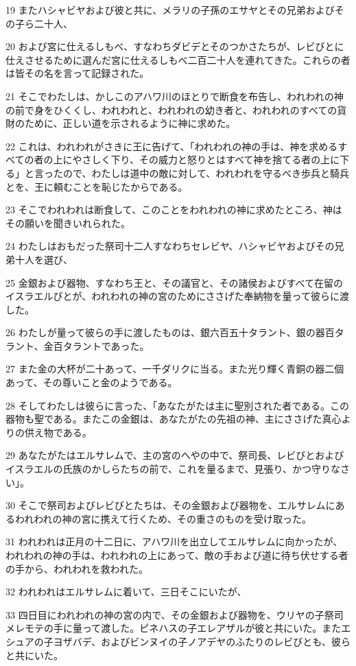 \par 19 またハシャビヤおよび彼と共に、メラリの子孫のエサヤとその兄弟およびその子ら二十人、
\par 20 および宮に仕えるしもべ、すなわちダビデとそのつかさたちが、レビびとに仕えさせるために選んだ宮に仕えるしもべ二百二十人を連れてきた。これらの者は皆その名を言って記録された。
\par 21 そこでわたしは、かしこのアハワ川のほとりで断食を布告し、われわれの神の前で身をひくくし、われわれと、われわれの幼き者と、われわれのすべての貨財のために、正しい道を示されるように神に求めた。
\par 22 これは、われわれがさきに王に告げて、「われわれの神の手は、神を求めるすべての者の上にやさしく下り、その威力と怒りとはすべて神を捨てる者の上に下る」と言ったので、わたしは道中の敵に対して、われわれを守るべき歩兵と騎兵とを、王に頼むことを恥じたからである。
\par 23 そこでわれわれは断食して、このことをわれわれの神に求めたところ、神はその願いを聞きいれられた。
\par 24 わたしはおもだった祭司十二人すなわちセレビヤ、ハシャビヤおよびその兄弟十人を選び、
\par 25 金銀および器物、すなわち王と、その議官と、その諸侯およびすべて在留のイスラエルびとが、われわれの神の宮のためにささげた奉納物を量って彼らに渡した。
\par 26 わたしが量って彼らの手に渡したものは、銀六百五十タラント、銀の器百タラント、金百タラントであった。
\par 27 また金の大杯が二十あって、一千ダリクに当る。また光り輝く青銅の器二個あって、その尊いこと金のようである。
\par 28 そしてわたしは彼らに言った、「あなたがたは主に聖別された者である。この器物も聖である。またこの金銀は、あなたがたの先祖の神、主にささげた真心よりの供え物である。
\par 29 あなたがたはエルサレムで、主の宮のへやの中で、祭司長、レビびとおよびイスラエルの氏族のかしらたちの前で、これを量るまで、見張り、かつ守りなさい」。
\par 30 そこで祭司およびレビびとたちは、その金銀および器物を、エルサレムにあるわれわれの神の宮に携えて行くため、その重さのものを受け取った。
\par 31 われわれは正月の十二日に、アハワ川を出立してエルサレムに向かったが、われわれの神の手は、われわれの上にあって、敵の手および道に待ち伏せする者の手から、われわれを救われた。
\par 32 われわれはエルサレムに着いて、三日そこにいたが、
\par 33 四日目にわれわれの神の宮の内で、その金銀および器物を、ウリヤの子祭司メレモテの手に量って渡した。ピネハスの子エレアザルが彼と共にいた。またエシュアの子ヨザバデ、およびビンヌイの子ノアデヤのふたりのレビびとも、彼らと共にいた。
